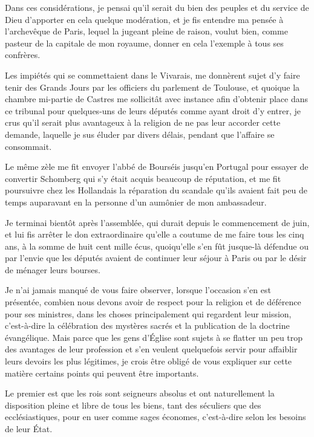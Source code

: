 \documentclass[french,twoside]{book} %
\begin{document}
Dans ces considérations, je pensai qu’il serait du bien des peuples et du service de Dieu d’apporter en cela quelque modération, et je fis entendre ma pensée à l’archevêque de Paris, lequel la jugeant pleine de raison, voulut bien, comme pasteur de la capitale de mon royaume, donner en cela l’exemple à tous ses confrères.\par
Les impiétés qui se commettaient dans le Vivarais, me donnèrent sujet d’y faire tenir des Grands Jours par les officiers du parlement de Toulouse, et quoique la chambre mi-partie de Castres me sollicitât avec instance afin d’obtenir place dans ce tribunal pour quelques-uns de leurs députés comme ayant droit d’y entrer, je crus qu’il serait plus avantageux à la religion de ne pas leur accorder cette demande, laquelle je sus éluder par divers délais, pendant que l’affaire se consommait.\par
Le même zèle me fit envoyer l’abbé de Bourséis jusqu’en Portugal pour essayer de convertir Schomberg qui s’y était acquis beaucoup de réputation, et me fit poursuivre chez les Hollandais la réparation du scandale qu’ils avaient fait peu de temps auparavant en la personne d’un aumônier de mon ambassadeur.\par
Je terminai bientôt après l’assemblée, qui durait depuis le commencement de juin, et lui fis arrêter le don extraordinaire qu’elle a coutume de me faire tous les cinq ans, à la somme de huit cent mille écus, quoiqu’elle s’en fût jusque-là défendue ou par l’envie que les députés avaient de continuer leur séjour à Paris ou par le désir de ménager leurs bourses.\par
Je n’ai jamais manqué de vous faire observer, lorsque l’occasion s’en est présentée, combien nous devons avoir de respect pour la religion et de déférence pour ses ministres, dans les choses principalement qui regardent leur mission, c’est-à-dire la célébration des mystères sacrés et la publication de la doctrine évangélique. Mais parce que les gens d’Église sont sujets à se flatter un peu trop des avantages de leur profession et s’en veulent quelquefois servir pour affaiblir leurs devoirs les plus légitimes, je crois être obligé de vous expliquer sur cette matière certains points qui peuvent être importants.\par
Le premier est que les rois sont seigneurs absolus et ont naturellement la disposition pleine et libre de tous les biens, tant des séculiers que des ecclésiastiques, pour en user comme sages économes, c’est-à-dire selon les besoins de leur État.\par
\end{document}
